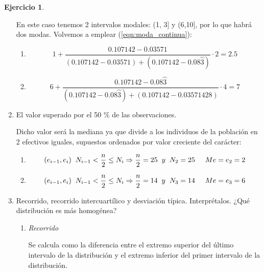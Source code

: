 \documentclass[a4paper, 12pt]{article}
\theoremstyle{definition}
\newtheorem{ej}{Ejercicio}
\begin{document}
\begin{ej}
\begin{enumerate}[label=\textit{\alph*)}]
    En este caso tenemos 2 intervalos modales: (1, 3] y (6,10], por lo que habrá dos modas. Volvemos a emplear (\ref{eqn:moda_continua}):
    
    \begin{enumerate}[label=(\arabic*)]
        \item 
    \[
    1 + \frac{0.107142 - 0.03571}{(0.107142-0.03571) + (0.107142 - 0.08\wideparen{3})} \cdot 2 = 2.5
    \]
    
    \item
    \[
    6 + \frac{0.107142 - 0.08\wideparen{3}}{(0.107142-0.08\wideparen{3}) + (0.107142 - 0.03571428)} \cdot 4 = 7
    \]
    \end{enumerate}
    
    \item El valor superado por el 50 \% de las observaciones.
    
    Dicho valor será la mediana ya que divide a los individuos de la población en 2 efectivos iguales, supuestos ordenados por valor creciente del carácter:
    \begin{enumerate}[label=(\arabic*)]
        \item  
        \[
        (e_{i-1}, e_i) \hspace{0.2cm} N_{i-1} < \frac{n}{2} \leq N_i \Rightarrow \frac{n}{2} = 25 \hspace{0.2cm} y \hspace{0.2cm} N_2 = 25 \hspace{0.5cm} Me = e_2 = 2
        \]
        
        \item  
        \[
        (e_{i-1}, e_i) \hspace{0.2cm} N_{i-1} < \frac{n}{2} \leq N_i \Rightarrow \frac{n}{2} = 14 \hspace{0.2cm} y \hspace{0.2cm} N_3 = 14 \hspace{0.5cm} Me = e_3 = 6
        \]
    \end{enumerate}
    
    \item Recorrido, recorrido intercuartílico y desviación típica. Interprétalos. ¿Qué distribución es más homogénea?
    
    \begin{enumerate}[label=\arabic*)]
        \item \textit{Recorrido}
        
    Se calcula como la diferencia entre el extremo superior del último intervalo de la distribución y el extremo inferior del primer intervalo de la distribución.
    

\end{enumerate}
\end{enumerate}
\end{ej}
\end{document}

